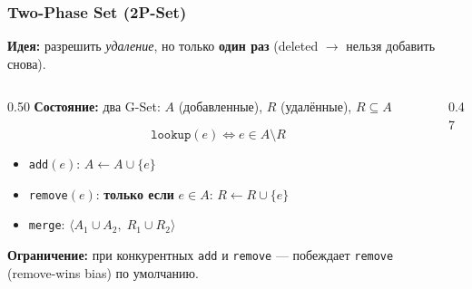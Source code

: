 \documentclass{beamer}
\begin{document}
\begin{frame}
\frametitle{Two-Phase Set (2P-Set)}

\textbf{Идея:} разрешить \emph{удаление}, но только \textbf{один раз} (deleted $\rightarrow$ нельзя добавить снова).

\begin{columns}
\begin{column}{0.50\textwidth}
\textbf{Состояние:} два G-Set: $A$ (добавленные), $R$ (удалённые), $R \subseteq A$

\[
  \texttt{lookup}(e) \Leftrightarrow e \in A \setminus R
\]

\begin{itemize}
  \item \texttt{add}$(e)$: $A \leftarrow A \cup \{e\}$
  \item \texttt{remove}$(e)$: \textbf{только если} $e \in A$: $R \leftarrow R \cup \{e\}$
  \item \texttt{merge}: $\langle A_1 \cup A_2,\; R_1 \cup R_2 \rangle$
\end{itemize}

\medskip
\textbf{Ограничение:} при конкурентных \texttt{add} и \texttt{remove} — побеждает \texttt{remove} (remove-wins bias) по умолчанию.
\end{column}
\begin{column}{0.47\textwidth}
\end{column}
\end{columns}

\end{frame}
\end{document}
